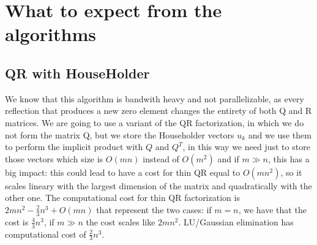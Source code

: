 \documentclass{article}
\begin{document}
\section{What to expect from the algorithms}

\subsection{QR with HouseHolder}
We know that this algorithm is bandwith heavy and not parallelizable, as every reflection that produces a new zero element changes the entirety of both Q and R matrices.
We are going to use a variant of the QR factorization, in which we do not form the matrix Q, but we store the Householder vectors $u_k$ and we use them to perform the implicit product with $Q$ and $Q^T$, in this way we need just to store those vectors which size is $O(mn)$ instead of $O(m^2)$ and if $m \gg n$, this has a big impact: this could lead to have a cost for thin QR equal to $O(mn^2)$, so it scales lineary with the largest dimension of the matrix and quadratically with the other one. The computational cost for thin QR factorization is $2mn^2 - \frac{2}{3}n^3 + O(mn)$ that represent the two cases: if $m = n$, we have that the cost is $\frac{4}{3}n^3$, if $m \gg n$ the cost scales like $2mn^2$. LU/Gaussian elimination has computational cost of $\frac{2}{3}n^3$.
\end{document}
